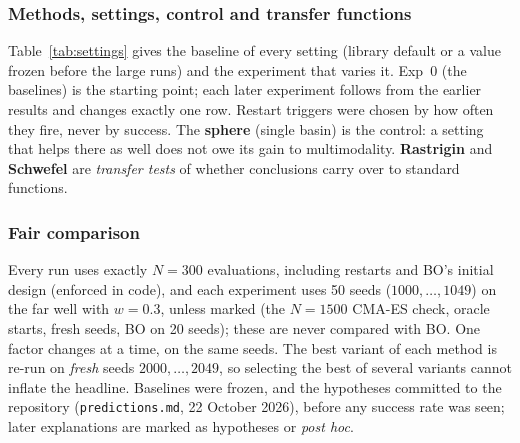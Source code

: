 \documentclass[10pt,a4paper]{article}
\begin{document}
\subsubsection{Methods, settings, control and transfer functions}
Table~\ref{tab:settings} gives the baseline of every setting (library default or a value frozen before the large runs) and the experiment that varies it. Exp~0 (the baselines) is the starting point; each later experiment follows from the earlier results and changes exactly one row. Restart triggers were chosen by how often they fire, never by success. The \textbf{sphere} (single basin) is the control: a setting that helps there as well does not owe its gain to multimodality. \textbf{Rastrigin} and \textbf{Schwefel} are \emph{transfer tests} of whether conclusions carry over to standard functions.

\subsubsection{Fair comparison}
Every run uses exactly $N=300$ evaluations, including restarts and BO's initial design (enforced in code), and each experiment uses 50 seeds ($1000,\dots,1049$) on the far well with $w=0.3$, unless marked (the $N=1500$ CMA-ES check, oracle starts, fresh seeds, BO on 20 seeds); these are never compared with BO. One factor changes at a time, on the same seeds. The best variant of each method is re-run on \emph{fresh} seeds $2000,\dots,2049$, so selecting the best of several variants cannot inflate the headline. Baselines were frozen, and the hypotheses committed to the repository (\texttt{predictions.md}, 22 October 2026), before any success rate was seen; later explanations are marked as hypotheses or \emph{post hoc}.
\end{document}
